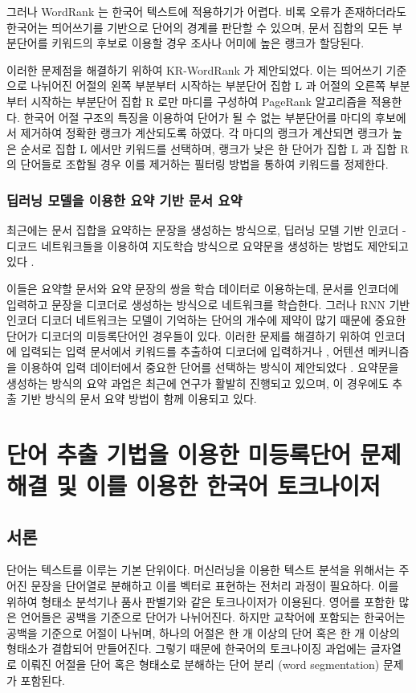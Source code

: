 \documentclass[oneside, ko,phd]{snuthesis_utf8_kor}
\begin{document}
그러나 WordRank 는 한국어 텍스트에 적용하기가 어렵다.
비록 오류가 존재하더라도 한국어는 띄어쓰기를 기반으로 단어의 경계를 판단할 수 있으며, 문서 집합의 모든 부분단어를 키워드의 후보로 이용할 경우 조사나 어미에 높은 랭크가 할당된다.

이러한 문제점을 해결하기 위하여 KR-WordRank \cite{kim2014kr} 가 제안되었다.
이는 띄어쓰기 기준으로 나뉘어진 어절의 왼쪽 부분부터 시작하는 부분단어 집합 L 과 어절의 오른쪽 부분부터 시작하는 부분단어 집합 R 로만 마디를 구성하여 PageRank 알고리즘을 적용한다.
한국어 어절 구조의 특징을 이용하여 단어가 될 수 없는 부분단어를 마디의 후보에서 제거하여 정확한 랭크가 계산되도록 하였다.
각 마디의 랭크가 계산되면 랭크가 높은 순서로 집합 L 에서만 키워드를 선택하며, 랭크가 낮은 한 단어가 집합 L 과 집합 R 의 단어들로 조합될 경우 이를 제거하는 필터링 방법을 통하여 키워드를 정제한다.

\subsection{딥러닝 모델을 이용한 요약 기반 문서 요약}

최근에는 문서 집합을 요약하는 문장을 생성하는 방식으로, 딥러닝 모델 기반 인코더 - 디코드 네트워크들을 이용하여 지도학습 방식으로 요약문을 생성하는 방법도 제안되고 있다 \cite{rush2015neural}.

이들은 요약할 문서와 요약 문장의 쌍을 학습 데이터로 이용하는데, 문서를 인코더에 입력하고 문장을 디코더로 생성하는 방식으로 네트워크를 학습한다.
그러나 RNN 기반 인코더 디코더 네트워크는 모델이 기억하는 단어의 개수에 제약이 많기 때문에 중요한 단어가 디코더의 미등록단어인 경우들이 있다.
이러한 문제를 해결하기 위하여 인코더에 입력되는 입력 문서에서 키워드를 추출하여 디코더에 입력하거나 \cite{nallapati2016abstractive}, 어텐션 메커니즘을 이용하여 입력 데이터에서 중요한 단어를 선택하는 방식이 제안되었다 \cite{see2017get, gu2016incorporating}.
요약문을 생성하는 방식의 요약 과업은 최근에 연구가 활발히 진행되고 있으며, 이 경우에도 추출 기반 방식의 문서 요약 방법이 함께 이용되고 있다.
 
\newpage
\chapter{단어 추출 기법을 이용한 미등록단어 문제 해결 및 이를 이용한 한국어 토크나이저} \label{word_extraction}

\section{서론}
단어는 텍스트를 이루는 기본 단위이다.
머신러닝을 이용한 텍스트 분석을 위해서는 주어진 문장을 단어열로 분해하고 이를 벡터로 표현하는 전처리 과정이 필요하다.
이를 위하여 형태소 분석기나 품사 판별기와 같은 토크나이저가 이용된다.
영어를 포함한 많은 언어들은 공백을 기준으로 단어가 나뉘어진다.
하지만 교착어에 포함되는 한국어는 공백을 기준으로 어절이 나뉘며, 하나의 어절은 한 개 이상의 단어 혹은 한 개 이상의 형태소가 결합되어 만들어진다.
그렇기 때문에 한국어의 토크나이징 과업에는 글자열로 이뤄진 어절을 단어 혹은 형태소로 분해하는 단어 분리 (word segmentation) 문제가 포함된다.
\end{document}
